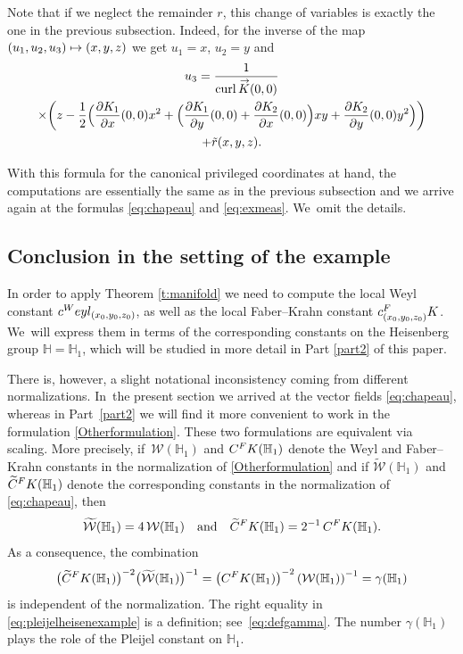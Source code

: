 \documentclass[11pt]{article}
\newcommand\mto{\mathchoice{\longmapsto}{\mapsto}{\mapsto}{\mapsto}}
\newcommand{\FK}{\textup{FK}}
\newcommand{\Weyl}{\textup{Weyl}}
\DeclareMathOperator{\curl}{curl}
\renewcommand{\vec}[1]
{\overset{\,{\raisebox{-2pt}{$\scriptstyle\to$}}}{#1}}
\theoremstyle{definition}
\newcommand{\1}{\mathbbm{1}}
\numberwithin{equation}{section}
\begin{document}
Note that if we neglect the remainder $r$, this change of variables is exactly the one in the previous subsection. Indeed, for the inverse of the map $(u_1,u_2,u_3)\mto (x,y,z)$ we get $u_1=x$, $u_2=y$ and
\begin{multline*}
u_3 = \frac{1}{\curl \vec K (0,0)}\\
\times\biggl(z - \frac12 \Bigl(\frac{\partial K_1}{\partial x}(0,0) x^2+ \Bigl(\frac{\partial K_1}{\partial y}(0,0) + \frac{\partial K_2}{\partial x}(0,0) \Bigr) xy
+ \frac{\partial K_2}{\partial y}(0,0) y^2\Bigr) \biggr) \\
+ \tilde r(x,y,z).
\end{multline*}

With this formula for the canonical privileged coordinates at hand, the computations are essentially the same as in the previous subsection and we arrive again at the formulas \eqref{eq:chapeau} and \eqref{eq:exmeas}. We~omit the details.

\subsection{Conclusion in the setting of the example}\label{sec:exampleconclusion}
In order to apply Theorem \ref{t:manifold} we need to compute the local Weyl constant $c^\Weyl_{(x_0,y_0,z_0)}$, as well as the local Faber--Krahn constant $c_{(x_0,y_0,z_0)}^\FK$. We~will express them in terms of the corresponding constants on the Heisenberg group $\mathbb H = \mathbb H_1$, which will be studied in more detail in Part \ref{part2} of this paper.

There is, however, a slight notational inconsistency coming from different normalizations. In~the present section we arrived at the vector fields \eqref{eq:chapeau}, whereas in Part~\ref{part2} we will find it more convenient to work in the formulation \eqref{Otherformulation}. These two formulations are equivalent via scaling. More precisely, if~$\mathcal W(\mathbb H_1)$ and $C^\FK(\mathbb H_1)$ denote the Weyl and Faber--Krahn constants in the normalization of \eqref{Otherformulation} and if
$\widetilde{\mathcal W}(\mathbb H_1)$ and $\widetilde C^\FK(\mathbb H_1)$ denote the corresponding constants in the normalization of \eqref{eq:chapeau}, then
\[
\widetilde{\mathcal W}(\mathbb H_1) = 4\,\mathcal W(\mathbb H_1)
\quad\text{and}\quad
\widetilde C^\FK(\mathbb H_1) = 2^{-1}\,C^\FK(\mathbb H_1).
\]
As a consequence, the combination
\begin{equation}
\label{eq:pleijelheisenexample}
\bigl(\widetilde C^\FK(\mathbb H_1)\bigr)^{-2} \bigl(\widetilde{\mathcal W}(\mathbb H_1)\bigr)^{-1} = \left(C^\FK(\mathbb H_1)\right)^{-2} \left(\mathcal W(\mathbb H_1)\right)^{-1} = \gamma(\mathbb H_1)
\end{equation}
is independent of the normalization. The right equality in \eqref{eq:pleijelheisenexample} is a definition; see~\eqref{eq:defgamma}. The number $\gamma(\mathbb H_1)$ plays the role of the Pleijel constant on $\mathbb H_1$.
\end{document}
